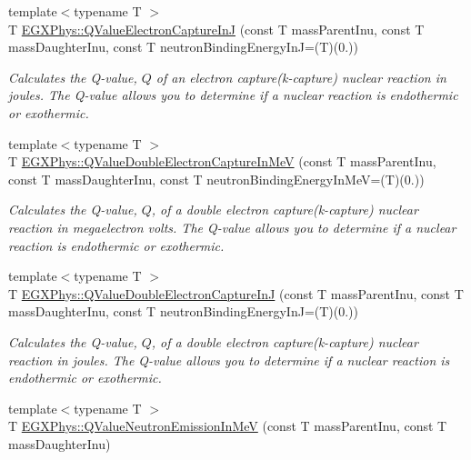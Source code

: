\begin{DoxyCompactItemize}
{\footnotesize template$<$typename T $>$ }\\T \mbox{\hyperlink{group___e_g_x_phys-_q_value-_electron_capture_gaf2569f9c706130b730dcf55695780263}{E\+G\+X\+Phys\+::\+Q\+Value\+Electron\+Capture\+InJ}} (const T mass\+Parent\+Inu, const T mass\+Daughter\+Inu, const T neutron\+Binding\+Energy\+InJ=(T)(0.))
\begin{DoxyCompactList}\small\item\em Calculates the Q-\/value, $Q$ of an electron capture(k-\/capture) nuclear reaction in joules. The Q-\/value allows you to determine if a nuclear reaction is endothermic or exothermic. \end{DoxyCompactList}\item 
{\footnotesize template$<$typename T $>$ }\\T \mbox{\hyperlink{group___e_g_x_phys-_q_value-_electron_capture_gab16ac92ae27b2c0c96c7abc35f949cb8}{E\+G\+X\+Phys\+::\+Q\+Value\+Double\+Electron\+Capture\+In\+MeV}} (const T mass\+Parent\+Inu, const T mass\+Daughter\+Inu, const T neutron\+Binding\+Energy\+In\+MeV=(T)(0.))
\begin{DoxyCompactList}\small\item\em Calculates the Q-\/value, $Q$, of a double electron capture(k-\/capture) nuclear reaction in megaelectron volts. The Q-\/value allows you to determine if a nuclear reaction is endothermic or exothermic. \end{DoxyCompactList}\item 
{\footnotesize template$<$typename T $>$ }\\T \mbox{\hyperlink{group___e_g_x_phys-_q_value-_electron_capture_gacb431a07ac565f8e48a08c25544e5d22}{E\+G\+X\+Phys\+::\+Q\+Value\+Double\+Electron\+Capture\+InJ}} (const T mass\+Parent\+Inu, const T mass\+Daughter\+Inu, const T neutron\+Binding\+Energy\+InJ=(T)(0.))
\begin{DoxyCompactList}\small\item\em Calculates the Q-\/value, $Q$, of a double electron capture(k-\/capture) nuclear reaction in joules. The Q-\/value allows you to determine if a nuclear reaction is endothermic or exothermic. \end{DoxyCompactList}\item 
{\footnotesize template$<$typename T $>$ }\\T \mbox{\hyperlink{group___e_g_x_phys-_q_value-_neutron_emission_ga8ad6e53cb04260eb9b140e22b5b6d9f6}{E\+G\+X\+Phys\+::\+Q\+Value\+Neutron\+Emission\+In\+MeV}} (const T mass\+Parent\+Inu, const T mass\+Daughter\+Inu)

\end{DoxyCompactItemize}
